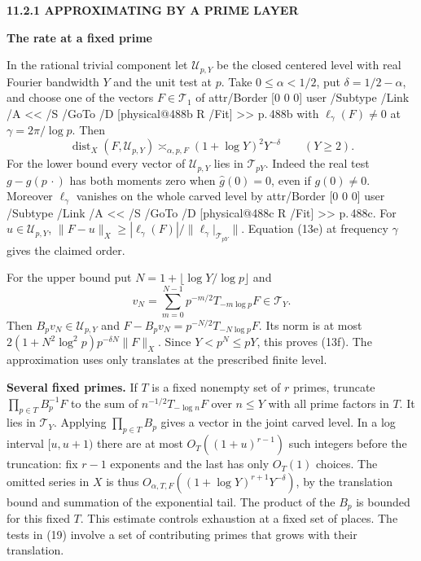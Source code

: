 \documentclass[11pt,letterpaper]{article}
\makeatletter
\newcommand{\rightmarktext}{}
\newcommand{\printfolio}{}
\newcommand{\leaf}[4]{\clearpage\gdef\printfolio{#1}\gdef\rightmarktext{#2}%
  {\small\sffamily\bfseries\color{ink}#3\par}\vspace{3pt}%
  {\LARGE\bfseries #4\par}\vspace{5pt}}
\newcommand{\point}[1]{\par\smallskip\textbf{#1.}\enspace\ignorespaces}
\newcommand{\MusicPDFPageRef}[1]{\pdfpageref\csname physical@#1\endcsname\space\space 0 R}
\newcommand{\pagelink}[2]{\leavevmode\pdfstartlink attr{/Border [0 0 0]} user{%
  /Subtype /Link /A << /S /GoTo /D [\MusicPDFPageRef{#1} /Fit] >>}%
  {\color{ink}#2}\pdfendlink}
\newcommand{\pg}[1]{\pagelink{#1}{p.\,#1}}
\makeatother
\begin{document}
\leaf{488d}{Paley--Wiener levels}{11.2.1 \quad APPROXIMATING BY A PRIME LAYER}{The rate at a fixed prime}
In the rational trivial component let $\mathcal U_{p,Y}$ be the closed
centered level with real Fourier bandwidth $Y$ and the unit test at
$p$. Take $0\le\alpha<1/2$, put $\delta=1/2-\alpha$, and choose one of
the vectors $F\in\mathcal T_1$ of \pg{488b} with
$\ell_\gamma(F)\ne0$ at $\gamma=2\pi/\log p$. Then
\[
  \operatorname{dist}_X(F,\mathcal U_{p,Y})
       \asymp_{\alpha,p,F}(1+\log Y)^2Y^{-\delta}\qquad(Y\ge2).
 \tag{13f}
\]
For the lower bound every vector of $\mathcal U_{p,Y}$ lies in
$\mathcal T_{pY}$. Indeed the real test $g-g(p\,\cdot)$ has both
moments zero when $\widehat g(0)=0$, even if $g(0)\ne0$.
Moreover $\ell_\gamma$ vanishes on the whole carved level by \pg{488c}.
For $u\in\mathcal U_{p,Y}$,
$\|F-u\|_X\ge|\ell_\gamma(F)|/\|\ell_\gamma|_{\mathcal T_{pY}}\|$.
Equation (13e) at frequency $\gamma$ gives the claimed order.

For the upper bound put $N=1+\lfloor\log Y/\log p\rfloor$ and
\[
       v_N=\sum_{m=0}^{N-1}p^{-m/2}T_{-m\log p}F\in\mathcal T_Y .
\]
Then $B_pv_N\in\mathcal U_{p,Y}$ and
$F-B_pv_N=p^{-N/2}T_{-N\log p}F$. Its norm is at most
$2(1+N^2\log^2 p)p^{-\delta N}\|F\|_X$. Since $Y<p^N\le pY$,
this proves (13f). The approximation uses only translates at the
prescribed finite level.

\point{Several fixed primes} If $T$ is a fixed nonempty set of $r$
primes, truncate $\prod_{p\in T}B_p^{-1}F$ to the sum of
$n^{-1/2}T_{-\log n}F$ over $n\le Y$ with all prime factors in $T$.
It lies in $\mathcal T_Y$. Applying $\prod_{p\in T}B_p$ gives a vector
in the joint carved level. In a log interval $[u,u+1)$ there are at most
$O_T((1+u)^{r-1})$ such integers before the truncation: fix $r-1$
exponents and the last has only $O_T(1)$ choices. The omitted series
in $X$ is thus $O_{\alpha,T,F}((1+\log Y)^{r+1}Y^{-\delta})$,
by the translation bound and summation of the exponential tail.
The product of the $B_p$ is bounded for this fixed $T$. This estimate
controls exhaustion at a fixed set of places. The tests in (19) involve
a set of contributing primes that grows with their translation.
\end{document}
